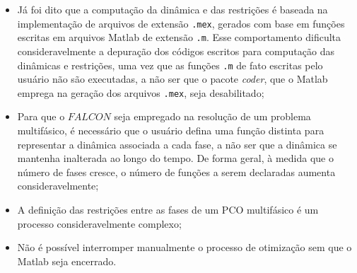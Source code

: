 \begin{itemize}
	\item Já foi dito que a computação da dinâmica e das restrições é baseada na implementação de arquivos de extensão \texttt{.mex}, gerados com base em funções escritas em arquivos Matlab\textsuperscript{\textregistered} de extensão \texttt{.m}. Esse comportamento dificulta consideravelmente a depuração dos códigos escritos para computação das dinâmicas e restrições, uma vez que as funções \texttt{.m} de fato escritas pelo usuário não são executadas, a não ser que o pacote \textit{coder}, que o Matlab\textsuperscript{\textregistered} emprega na geração dos arquivos \texttt{.mex}, seja desabilitado;
	
	\item Para que o $FALCON$ seja empregado na resolução de um problema multifásico, é necessário que o usuário defina uma função distinta para representar a dinâmica associada a cada fase, a não ser que a dinâmica se mantenha inalterada ao longo do tempo. De forma geral, à medida que o número de fases cresce, o número de funções a serem declaradas aumenta consideravelmente;
	
	\item A definição das restrições entre as fases de um PCO multifásico é um processo consideravelmente complexo;
	
	\item Não é possível interromper manualmente o processo de otimização sem que o Matlab\textsuperscript{\textregistered} seja encerrado.
\end{itemize}

